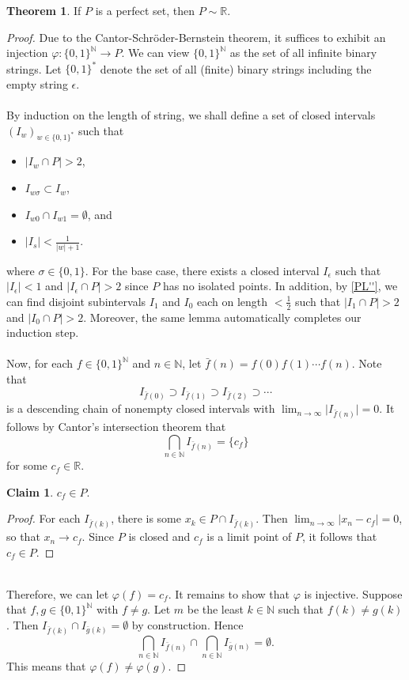 \documentclass[10pt,letterpaper,cm]{nupset}
\theoremstyle{definition}
\theoremstyle{theorem}
\newtheorem{theorem}[definition]{Theorem}
\newtheorem*{claim}{Claim}
\theoremstyle{remark}
\newcommand{\N}{\mathbb N}
\newcommand{\R}{\mathbb R}
\newcommand{\1}{\mathbf{1}}
\newcommand{\0}{\vec 0}
\begin{document}
\begin{theorem}
If $P$ is a perfect set, then $P \sim \R$.
\end{theorem}
\begin{proof}
Due to  the Cantor-Schr\"oder-Bernstein theorem, it suffices to exhibit an injection $\varphi : \{0,1\}^{\N} \to P$. We can view $ \{0,1\}^{\N}$ as the set of all infinite binary strings. Let $\{0,1\}^{\ast}$ denote the set of all (finite) binary strings including the empty string $\epsilon$. 
\\ \\By induction on the length of string, we shall define a set of closed intervals $(I_w)_{w\in \{0,1\}^{\ast}}$ such that
\begin{itemize}
\item $\lvert{I_w \cap P}\rvert >2$,
\item $I_{w\sigma}\subset I_w$,
\item $I_{w0} \cap I_{w1} = \emptyset$, and
\item $\lvert{I_s}\rvert < \frac{1}{\lvert{w}\rvert+1}$.
\end{itemize}
where $\sigma \in \{0,1\}$. For the base case, there exists a closed interval $I_{\epsilon}$ such that $\lvert{I_{\epsilon}}\rvert < 1$ and $\lvert{I_{\epsilon}\cap P}\rvert >2$ since $P$ has no isolated points. In addition, by \cref{PL''}, we can find disjoint subintervals $I_1$ and $I_0$ each on length $< \frac{1}{2}$ such that $\lvert{I_1 \cap P}\rvert>2$ and $\lvert{I_0 \cap P}\rvert >2$. Moreover, the same lemma automatically completes our induction step. 
\\ \\ Now, for each $f\in \{0,1\}^{\N}$ and $n\in \N$, let $\bar{f}(n) = f(0)f(1)\cdots f(n)  $. Note that $$I_{\bar{f}(0)}\supset  I_{\bar{f}(1)} \supset I_{\bar{f}(2)} \supset \cdots $$  is a descending chain of nonempty closed intervals with $\lim_{n\to \infty} \lvert{I_{\bar{f}(n)}}\rvert =0$. It follows by  Cantor's intersection theorem  that $$\bigcap_{n \in \N} I_{\bar{f}(n)} = \{c_f\}$$ for some $c_f \in \R$. 
\begin{claim}
$c_f \in P$. 
\end{claim}
\begin{proof}
For each $I_{\bar{f}(k)}$, there is some $x_k \in P \cap I_{\bar{f}(k)}$. Then $\lim_{n\to \infty} \lvert{x_n - c_f}\rvert = 0$, so that $x_n \to c_f$. Since $P$ is closed and $c_f$ is a limit point of $P$, it follows that $c_f \in P$. 
\end{proof}$ $
\\Therefore, we can let $\varphi(f) = c_f$. It remains to show that $\varphi$ is injective. Suppose that $f, g \in \{0,1\}^{\N}$ with $f \ne g$.  Let $m$ be the least $k \in \N$ such that $f(k) \ne g(k)$. Then $I_{\bar{f}(k)} \cap I_{\bar{g}(k)} = \emptyset$ by construction. Hence $$\bigcap_{n \in \N} I_{\bar{f}(n)} \cap \bigcap_{n \in \N} I_{\bar{g}(n)} = \emptyset .$$ This means that $\varphi(f) \ne \varphi(g)$.
\end{proof}
\end{document}
